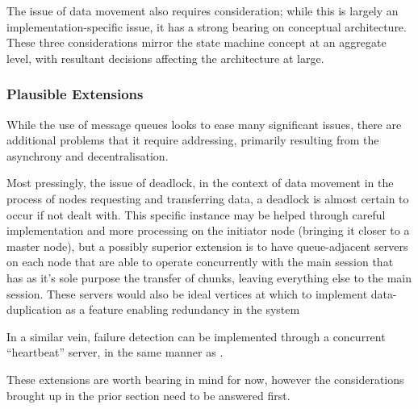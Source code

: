 The issue of data movement also requires consideration; while this is
largely an implementation-specific issue, it has a strong bearing on
conceptual architecture. These three considerations mirror the state
machine concept at an aggregate level, with resultant decisions
affecting the architecture at large.

\subsubsection{Plausible Extensions}\label{plausible-extensions}

While the use of message queues looks to ease many significant issues,
there are additional problems that it require addressing, primarily
resulting from the asynchrony and decentralisation.

Most pressingly, the issue of deadlock, in the context of data movement
in the process of nodes requesting and transferring data, a deadlock is
almost certain to occur if not dealt with. This specific instance may be
helped through careful implementation and more processing on the
initiator node (bringing it closer to a master node), but a possibly
superior extension is to have queue-adjacent servers on each node that
are able to operate concurrently with the main \R{} session that has as
it's sole purpose the transfer of chunks, leaving everything else to the
main \R{} session. These servers would also be ideal vertices at which to
implement data-duplication as a feature enabling redundancy in the
system

In a similar vein, failure detection can be implemented through a
concurrent ``heartbeat'' server, in the same manner as 
\cite{white2012hadoop}.

These extensions are worth bearing in mind for now, however the
considerations brought up in the prior section need to be answered
first.
